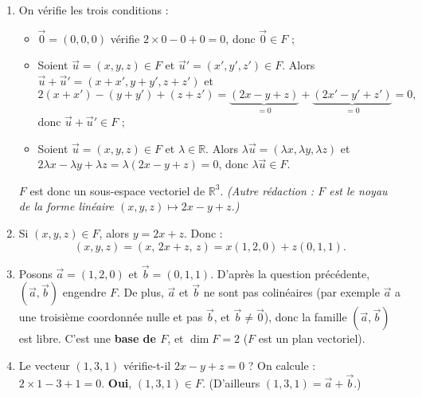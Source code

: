 \documentclass[11pt]{article}
\begin{document}
\begin{corrige}
\begin{enumerate}
\item On vérifie les trois conditions :
\begin{itemize}
\item $\vec{0} = (0,0,0)$ vérifie $2 \times 0 - 0 + 0 = 0$, donc $\vec{0} \in F$ ;
\item Soient $\vec{u} = (x, y, z) \in F$ et $\vec{u}' = (x', y', z') \in F$. Alors $\vec{u} + \vec{u}' = (x+x', y+y', z+z')$ et
\[ 2(x+x') - (y+y') + (z+z') = \underbrace{(2x - y + z)}_{=0} + \underbrace{(2x' - y' + z')}_{=0} = 0, \]
donc $\vec{u} + \vec{u}' \in F$ ;
\item Soient $\vec{u} = (x,y,z) \in F$ et $\lambda \in \mathbb{R}$. Alors $\lambda \vec{u} = (\lambda x, \lambda y, \lambda z)$ et $2\lambda x - \lambda y + \lambda z = \lambda(2x - y + z) = 0$, donc $\lambda \vec{u} \in F$.
\end{itemize}
$F$ est donc un sous-espace vectoriel de $\mathbb{R}^3$. \emph{(Autre rédaction : $F$ est le noyau de la forme linéaire $(x,y,z) \mapsto 2x - y + z$.)}
\item Si $(x, y, z) \in F$, alors $y = 2x + z$. Donc :
\[ (x, y, z) = (x, \, 2x + z, \, z) = x(1, 2, 0) + z(0, 1, 1). \]
\item Posons $\vec{a} = (1, 2, 0)$ et $\vec{b} = (0, 1, 1)$. D'après la question précédente, $(\vec{a}, \vec{b})$ engendre $F$. De plus, $\vec{a}$ et $\vec{b}$ ne sont pas colinéaires (par exemple $\vec{a}$ a une troisième coordonnée nulle et pas $\vec{b}$, et $\vec{b} \neq \vec{0}$), donc la famille $(\vec{a}, \vec{b})$ est libre. C'est une \textbf{base de $F$}, et $\boxed{\dim F = 2}$ ($F$ est un plan vectoriel).
\item Le vecteur $(1, 3, 1)$ vérifie-t-il $2x - y + z = 0$ ? On calcule : $2 \times 1 - 3 + 1 = 0$. \textbf{Oui}, $(1, 3, 1) \in F$. (D'ailleurs $(1,3,1) = \vec{a} + \vec{b}$.)
\end{enumerate}
\end{corrige}
\end{document}
